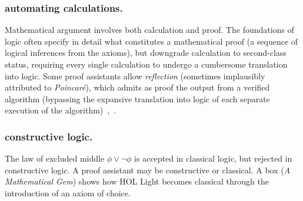 \documentclass{llncs}
\begin{document}
\subsubsection{automating calculations.} Mathematical argument
involves both calculation and proof.  The foundations of logic often
specify in detail what constitutes a mathematical proof (a sequence of
logical inferences from the axioms), but downgrade calculation to
second-class status, requiring every single calculation to undergo a
cumbersome translation into logic.
Some proof assistants allow {\it reflection} 
(sometimes implausibly attributed to {\it Poincar\'e}), 
which admits as proof the output from a verified
algorithm (bypassing the expansive translation into logic of each
separate execution of the algorithm)~\cite[p.~4]{HPSH},~\cite{BFM}.





\subsubsection{constructive logic.} The law of excluded middle
$\phi\lor\lnot \phi$ is accepted in classical logic, but rejected in
constructive logic.  A proof assistant may be constructive or
classical.  A box ({\it A Mathematical Gem}) shows how HOL Light
becomes classical through the introduction of an axiom of choice.

\newpage
\bigskip
\noindent
\end{document}
